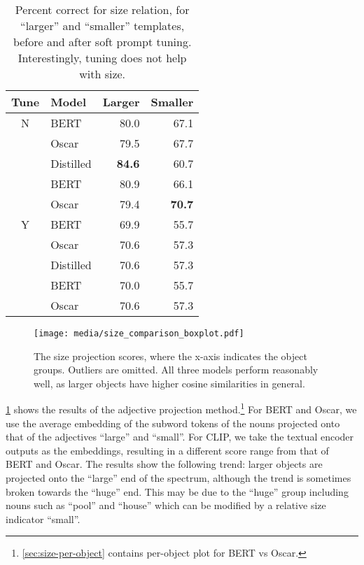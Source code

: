 \documentclass[11pt]{article}
\begin{document}
\begin{table}[t!]
\small
\centering
\begin{tabular}{clrr}
\hline
\textbf{Tune} & \textbf{Model} & \textbf{Larger} & \textbf{Smaller} \\
\hline
N & BERT & 80.0 & 67.1 \\
 & Oscar & 79.5 & 67.7 \\
 & Distilled & \textbf{84.6} & 60.7 \\
 & BERT & 80.9 & 66.1 \\
 & Oscar & 79.4 & \textbf{70.7} \\
\hline
Y & BERT & 69.9 & 55.7 \\
 & Oscar & 70.6 & 57.3 \\
 & Distilled & 70.6 & 57.3 \\
 & BERT & 70.0 & 55.7 \\
 & Oscar & 70.6 & 57.3 \\
\hline
\end{tabular}
\caption{\label{size_table}
Percent correct for size relation, for ``larger'' and ``smaller'' templates, before and after soft prompt tuning. Interestingly, tuning does not help with size.}
\vspace{-0.6em}
\end{table}

\begin{figure}[t]
    \centering
    \texttt{[image: media/size\_comparison\_boxplot.pdf]}
    \caption{The size projection scores, where the x-axis indicates the object groups. Outliers are omitted. All three models perform reasonably well, as larger objects have higher cosine similarities in general.}
    \label{fig:size_boxplot}
\vspace{-1em}
\end{figure}


\cref{fig:size_boxplot} shows the results of the adjective projection method.\footnote{ \cref{sec:size-per-object} contains per-object plot for BERT vs Oscar.} For BERT and Oscar, we use the average embedding of the subword tokens of the nouns projected onto that of the adjectives ``large'' and ``small''. For CLIP, we take the  textual encoder outputs as the embeddings, resulting in a different score range from that of BERT and Oscar. The results show the following trend: larger objects are projected onto the ``large'' end of the spectrum, although the trend is sometimes broken towards the ``huge'' end. This may be due to the ``huge'' group including nouns such as ``pool'' and ``house'' which can be modified by a relative size indicator ``small''.
\end{document}

